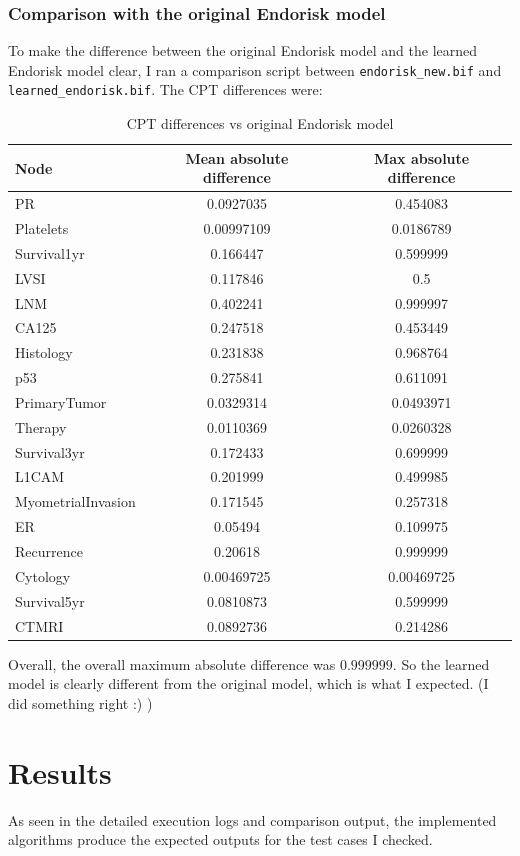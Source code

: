 \documentclass[11pt,a4paper]{article}
\begin{document}
\subsubsection{Comparison with the original Endorisk model}
To make the difference between the original Endorisk model and the learned Endorisk model clear, I ran a comparison script between \texttt{endorisk\_new.bif} and \texttt{learned\_endorisk.bif}. The CPT differences were:

\begin{table}[h]
\centering
\begin{tabular}{lcc}
\toprule
\textbf{Node} & \textbf{Mean absolute difference} & \textbf{Max absolute difference} \\
\midrule
PR & 0.0927035 & 0.454083 \\
Platelets & 0.00997109 & 0.0186789 \\
Survival1yr & 0.166447 & 0.599999 \\
LVSI & 0.117846 & 0.5 \\
LNM & 0.402241 & 0.999997 \\
CA125 & 0.247518 & 0.453449 \\
Histology & 0.231838 & 0.968764 \\
p53 & 0.275841 & 0.611091 \\
PrimaryTumor & 0.0329314 & 0.0493971 \\
Therapy & 0.0110369 & 0.0260328 \\
Survival3yr & 0.172433 & 0.699999 \\
L1CAM & 0.201999 & 0.499985 \\
MyometrialInvasion & 0.171545 & 0.257318 \\
ER & 0.05494 & 0.109975 \\
Recurrence & 0.20618 & 0.999999 \\
Cytology & 0.00469725 & 0.00469725 \\
Survival5yr & 0.0810873 & 0.599999 \\
CTMRI & 0.0892736 & 0.214286 \\
\bottomrule
\end{tabular}
\caption{CPT differences vs original Endorisk model}
\label{tab:cpt_differences_endorisk}
\end{table}

Overall, the overall maximum absolute difference was $0.999999$. So the learned model is clearly different from the original model, which is what I expected. (I did something right :) )

\section{Results}
As seen in the detailed execution logs and comparison output, the implemented algorithms produce the expected outputs for the test cases I checked.
\end{document}

